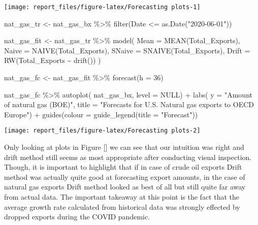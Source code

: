 \documentclass[
]{article}
\newenvironment{Shaded}{\begin{snugshade}}{\end{snugshade}}
\newcommand{\AttributeTok}[1]{\textcolor[rgb]{0.77,0.63,0.00}{#1}}
\newcommand{\ConstantTok}[1]{\textcolor[rgb]{0.00,0.00,0.00}{#1}}
\newcommand{\DecValTok}[1]{\textcolor[rgb]{0.00,0.00,0.81}{#1}}
\newcommand{\FunctionTok}[1]{\textcolor[rgb]{0.00,0.00,0.00}{#1}}
\newcommand{\NormalTok}[1]{#1}
\newcommand{\OtherTok}[1]{\textcolor[rgb]{0.56,0.35,0.01}{#1}}
\newcommand{\SpecialCharTok}[1]{\textcolor[rgb]{0.00,0.00,0.00}{#1}}
\newcommand{\StringTok}[1]{\textcolor[rgb]{0.31,0.60,0.02}{#1}}
\begin{document}
\begin{center}\texttt{[image: report\_files/figure-latex/Forecasting plots-1]} \end{center}

\begin{Shaded}
\begin{Highlighting}[]
\NormalTok{nat\_gas\_tr }\OtherTok{\textless{}{-}}\NormalTok{ nat\_gas\_bx }\SpecialCharTok{\%\textgreater{}\%} 
  \FunctionTok{filter}\NormalTok{(Date }\SpecialCharTok{\textless{}=} \FunctionTok{as.Date}\NormalTok{(}\StringTok{"2020{-}06{-}01"}\NormalTok{))}


\NormalTok{nat\_gas\_fit }\OtherTok{\textless{}{-}}\NormalTok{ nat\_gas\_tr }\SpecialCharTok{\%\textgreater{}\%} 
  \FunctionTok{model}\NormalTok{(}
    \AttributeTok{Mean =} \FunctionTok{MEAN}\NormalTok{(Total\_Exports),}
    \AttributeTok{Naive =} \FunctionTok{NAIVE}\NormalTok{(Total\_Exports),}
    \AttributeTok{SNaive =} \FunctionTok{SNAIVE}\NormalTok{(Total\_Exports),}
    \AttributeTok{Drift =} \FunctionTok{RW}\NormalTok{(Total\_Exports }\SpecialCharTok{\textasciitilde{}} \FunctionTok{drift}\NormalTok{())}
\NormalTok{  )}

\NormalTok{nat\_gas\_fc }\OtherTok{\textless{}{-}}\NormalTok{ nat\_gas\_fit }\SpecialCharTok{\%\textgreater{}\%} 
  \FunctionTok{forecast}\NormalTok{(}\AttributeTok{h =} \DecValTok{36}\NormalTok{)}

\NormalTok{nat\_gas\_fc }\SpecialCharTok{\%\textgreater{}\%} 
  \FunctionTok{autoplot}\NormalTok{(}
\NormalTok{    nat\_gas\_bx,}
    \AttributeTok{level =} \ConstantTok{NULL}\NormalTok{) }\SpecialCharTok{+}
  \FunctionTok{labs}\NormalTok{(}
    \AttributeTok{y =} \StringTok{"Amount of natural gas (BOE)"}\NormalTok{,}
    \AttributeTok{title =} \StringTok{"Forecasts for U.S. Natural gas exports to OECD Europe"}\NormalTok{) }\SpecialCharTok{+}
  \FunctionTok{guides}\NormalTok{(}\AttributeTok{colour =} \FunctionTok{guide\_legend}\NormalTok{(}\AttributeTok{title =} \StringTok{"Forecast"}\NormalTok{))}
\end{Highlighting}
\end{Shaded}

\begin{center}\texttt{[image: report\_files/figure-latex/Forecasting plots-2]} \end{center}

Only looking at plots in Figure {[}{]} we can see that our intuition was
right and drift method still seems as most appropriate after conducting
visual inspection. Though, it is important to highlight that if in case
of crude oil exports Drift method was actually quite good at forecasting
export amounts, in the case of natural gas exports Drift method looked
as best of all but still quite far away from actual data. The important
takeaway at this point is the fact that the average growth rate
calculated from historical data was strongly effected by dropped exports
during the COVID pandemic.
\end{document}
